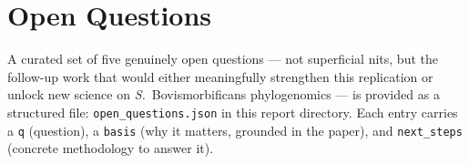 \documentclass[11pt]{article}
\begin{document}
\section{Open Questions}
A curated set of five genuinely open questions --- not superficial nits, but the follow-up work that would either meaningfully strengthen this replication or unlock new science on \emph{S.}\ Bovismorbificans phylogenomics --- is provided as a structured file: \texttt{open\_questions.json} in this report directory. Each entry carries a \texttt{q} (question), a \texttt{basis} (why it matters, grounded in the paper), and \texttt{next\_steps} (concrete methodology to answer it).
\end{document}
